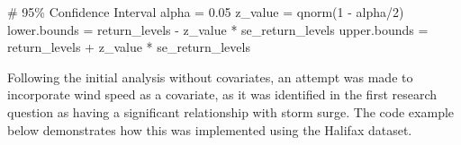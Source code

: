 \documentclass[
  letterpaper,
  DIV=11,
  numbers=noendperiod]{scrartcl}
\newenvironment{Shaded}{\begin{snugshade}}{\end{snugshade}}
\newcommand{\CommentTok}[1]{\textcolor[rgb]{0.37,0.37,0.37}{#1}}
\newcommand{\DecValTok}[1]{\textcolor[rgb]{0.68,0.00,0.00}{#1}}
\newcommand{\FloatTok}[1]{\textcolor[rgb]{0.68,0.00,0.00}{#1}}
\newcommand{\FunctionTok}[1]{\textcolor[rgb]{0.28,0.35,0.67}{#1}}
\newcommand{\NormalTok}[1]{\textcolor[rgb]{0.00,0.23,0.31}{#1}}
\newcommand{\OtherTok}[1]{\textcolor[rgb]{0.00,0.23,0.31}{#1}}
\newcommand{\SpecialCharTok}[1]{\textcolor[rgb]{0.37,0.37,0.37}{#1}}
\begin{document}
\begin{Shaded}
\begin{Highlighting}[]
\CommentTok{\# 95\% Confidence Interval}
\NormalTok{alpha }\OtherTok{=} \FloatTok{0.05}
\NormalTok{z\_value }\OtherTok{=} \FunctionTok{qnorm}\NormalTok{(}\DecValTok{1} \SpecialCharTok{{-}}\NormalTok{ alpha}\SpecialCharTok{/}\DecValTok{2}\NormalTok{)}
\NormalTok{lower.bounds }\OtherTok{=}\NormalTok{ return\_levels }\SpecialCharTok{{-}}\NormalTok{ z\_value }\SpecialCharTok{*}\NormalTok{ se\_return\_levels}
\NormalTok{upper.bounds }\OtherTok{=}\NormalTok{ return\_levels }\SpecialCharTok{+}\NormalTok{ z\_value }\SpecialCharTok{*}\NormalTok{ se\_return\_levels}
\end{Highlighting}
\end{Shaded}

Following the initial analysis without covariates, an attempt was made
to incorporate wind speed as a covariate, as it was identified in the
first research question as having a significant relationship with storm
surge. The code example below demonstrates how this was implemented
using the Halifax dataset.
\end{document}
